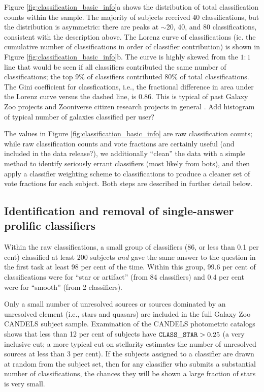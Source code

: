 \documentclass[useAMS,usenatbib]{mn2e}
\def\notecsm	{\color{titlecol2}}
\def\stellarity   {{\tt CLASS\_STAR}}
\begin{document}
{Figure \ref{fig:classification_basic_info}a shows the distribution of total classification counts within the sample. The majority of subjects received 40 classifications, but the distribution is asymmetric: there are peaks at $\sim 20$, $40$, and $80$ classifications, consistent with the description above. The Lorenz curve of classifications (ie. the cumulative number of classifications in order of classifier contribution) is shown in Figure \ref{fig:classification_basic_info}b. The curve is highly skewed from the $1:1$ line that would be seen if all classifiers contributed the same number of classifications; the top 9\% of classifiers contributed 80\% of total classifications. The Gini coefficient for classfications, i.e., the fractional difference in area under the Lorenz curve versus the dashed line, is 0.86. This is typical of past Galaxy Zoo projects and Zooniverse citizen research projects in general \citep{cox15}. {\notecsm Add histogram of typical number of galaxies classified per user?} 

The values in Figure \ref{fig:classification_basic_info} are raw classification counts; while raw classification counts and vote fractions are certainly useful {\notecsm (and included in the data release?)}, we additionally ``clean'' the data with a simple method to identify seriously errant classifiers (most likely from bots), and then apply a classifier weighting scheme to classifications to produce a cleaner set of vote fractions for each subject. Both steps are described in further detail below.

\subsection{Identification and removal of single-answer prolific classifiers}\label{sec:bots}

Within the raw classifications, a small group of classifiers (86, or less than 0.1 per cent) classified at least 200 subjects \emph{and} gave the same answer to the question in the first task at least 98 per cent of the time. Within this group, 99.6 per cent of classifications were for ``star or artifact'' (from 84 classifiers) and 0.4 per cent were for ``smooth'' (from 2 classifiers). 

Only a small number of unresolved sources or sources dominated by an unresolved element (i.e., stars and quasars) are included in the full Galaxy Zoo CANDELS subject sample. Examination of the CANDELS photometric catalogs \citep[][M. Peth et al., in preparation]{galametz13,guo13} shows that less than 12 per cent of subjects have $\stellarity > 0.25$ (a very inclusive cut; a more typical cut on stellarity estimates the number of unresolved sources at less than 3 per cent). If the subjects assigned to a classifier are drawn at random from the subject set, then for any classifier who submits a substantial number of classifications, the chances they will be shown a large fraction of stars is very small. 

}
\end{document}
